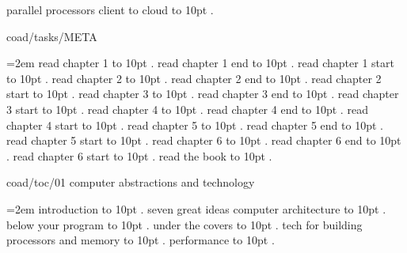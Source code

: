  parallel processors client to cloud \leaders\hbox to 10pt {\hss.\hss}  \hfill {}
\smallskip
\par\endgroup
\bigskip
{}
coad/tasks/META
\par\begingroup
\leftskip=2em
\smallskip
\medskip
read chapter 1 \leaders\hbox to 10pt {\hss.\hss}  \hfill {}
\smallskip
read chapter 1 end \leaders\hbox to 10pt {\hss.\hss}  \hfill {}
\smallskip
read chapter 1 start \leaders\hbox to 10pt {\hss.\hss}  \hfill {}
\smallskip
read chapter 2 \leaders\hbox to 10pt {\hss.\hss}  \hfill {}
\smallskip
read chapter 2 end \leaders\hbox to 10pt {\hss.\hss}  \hfill {}
\smallskip
read chapter 2 start \leaders\hbox to 10pt {\hss.\hss}  \hfill {}
\smallskip
read chapter 3 \leaders\hbox to 10pt {\hss.\hss}  \hfill {}
\smallskip
read chapter 3 end \leaders\hbox to 10pt {\hss.\hss}  \hfill {}
\smallskip
read chapter 3 start \leaders\hbox to 10pt {\hss.\hss}  \hfill {}
\smallskip
read chapter 4 \leaders\hbox to 10pt {\hss.\hss}  \hfill {}
\smallskip
read chapter 4 end \leaders\hbox to 10pt {\hss.\hss}  \hfill {}
\smallskip
read chapter 4 start \leaders\hbox to 10pt {\hss.\hss}  \hfill {}
\smallskip
read chapter 5 \leaders\hbox to 10pt {\hss.\hss}  \hfill {}
\smallskip
read chapter 5 end \leaders\hbox to 10pt {\hss.\hss}  \hfill {}
\smallskip
read chapter 5 start \leaders\hbox to 10pt {\hss.\hss}  \hfill {}
\smallskip
read chapter 6 \leaders\hbox to 10pt {\hss.\hss}  \hfill {}
\smallskip
read chapter 6 end \leaders\hbox to 10pt {\hss.\hss}  \hfill {}
\smallskip
read chapter 6 start \leaders\hbox to 10pt {\hss.\hss}  \hfill {}
\smallskip
read the book \leaders\hbox to 10pt {\hss.\hss}  \hfill {}
\smallskip
\par\endgroup
\bigskip
{}
coad/toc/01 computer abstractions and technology
\par\begingroup
\leftskip=2em
\smallskip
{} introduction \leaders\hbox to 10pt {\hss.\hss}  \hfill {}
 seven great ideas computer architecture \leaders\hbox to 10pt {\hss.\hss}  \hfill {}
 below your program \leaders\hbox to 10pt {\hss.\hss}  \hfill {}
 under the covers \leaders\hbox to 10pt {\hss.\hss}  \hfill {}
 tech for building processors and memory \leaders\hbox to 10pt {\hss.\hss}  \hfill {}
 performance \leaders\hbox to 10pt {\hss.\hss}  \hfill {}
